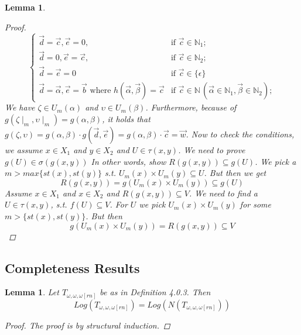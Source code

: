 \documentclass[12pt, a4paper]{scrartcl}
\newtheorem{lemma}[definition]{Lemma}
\begin{document}
\begin{lemma}
\begin{proof}
        \[
            \begin{cases}
            \vec{d} = \vec{c}, \vec{e} = 0, & \text{if }  \vec{c }\in \mathbb{N}_{1}; \\
            \vec{d} = 0, \vec{e} = \vec{c}, & \text{if }  \vec{c }\in \mathbb{N}_{2}; \\
            \vec{d} = \vec{e} = 0& \text{if } \vec{c }\in \{\epsilon\} \\
            \vec{d} = \vec{\alpha}, \vec{e} = \vec{b} \text{    where }h(\vec{\alpha},\vec{\beta}) = \vec{c} & \text{if } \vec{c } \in \mathbb{N} \, (\vec{\alpha} \in \mathbb{N}_1, \vec{\beta} \in \mathbb{N}_2);
            \end{cases}
        \] 
        \newline
        We have $\zeta \in U_m(\alpha)$ and $\upsilon \in U_m(\beta)$. Furthermore, because of $g(\zeta \mid_m, \upsilon \mid_m) = g(\alpha,\beta)$, it holds that $g(\zeta, \upsilon) = g(\alpha,\beta) \cdot g(\vec{d}, \vec{e}) = g(\alpha,\beta) \cdot \vec{c} = \vec{w}$. \newline \newline 
        Now to check the conditions, we assume $x \in X_1$ and $y \in X_2$ and $U \in \tau(x,y)$. We need to prove $g(U) \in \sigma(g(x,y))$ In other words, show $R(g(x,y)) \subseteq g(U)$. We pick a $m> max\{st(x),st(y)\}$ s.t. $U_m(x) \times U_m(y) \subseteq U$. But then we get 
        $$R(g(x,y)) = g(U_m(x) \times U_m(y)) \subseteq g(U)$$
        \newline
        Assume  $x \in X_1$ and $x \in X_2$ and $R(g(x,y)) \subseteq V$. We need to find a $U \in \tau(x,y)$, s.t. $f(U) \subseteq V$.
        For $U$ we pick $U_m(x) \times U_m(y)$ for some $m > \{st(x), st(y)\}$. But then 
        $$g(U_m(x) \times U_m(y)) = R(g(x,y)) \subseteq V$$

        \end{proof}
    \end{lemma}

    \subsection{Completeness Results}

    \begin{lemma}
    Let $T_{\omega,\omega,\omega[rn]}$ be as in Definition 4.0.3. Then 
    $$Log(T_{\omega,\omega,\omega[rn]}) = Log(N(T_{\omega,\omega,\omega[rn]}))$$
    \begin{proof}
            The proof is by structural induction.
    \end{proof}

    \end{lemma}
\end{document}
